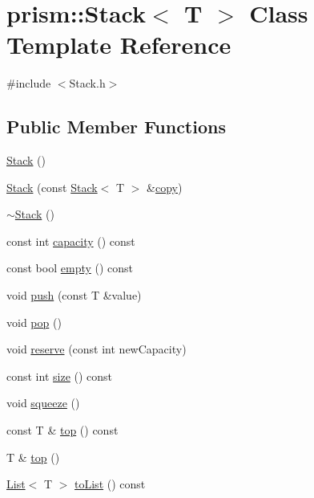 \hypertarget{classprism_1_1_stack}{}\section{prism\+:\+:Stack$<$ T $>$ Class Template Reference}
\label{classprism_1_1_stack}


{\ttfamily \#include $<$Stack.\+h$>$}

\subsection*{Public Member Functions}
\begin{DoxyCompactItemize}
\item 
\hyperlink{classprism_1_1_stack_aa28cd4f7d2c39d7f3828460d662c3725}{Stack} ()
\item 
\hyperlink{classprism_1_1_stack_ae2de2835a81ce5f19d6463bb7641c44f}{Stack} (const \hyperlink{classprism_1_1_stack}{Stack}$<$ T $>$ \&\hyperlink{namespaceprism_ae776f4cd825f79e7af1cf6ee1d90a209}{copy})
\item 
\hyperlink{classprism_1_1_stack_afd4f167bfe42d9b432d3d107a4fc1657}{$\sim$\+Stack} ()
\item 
const int \hyperlink{classprism_1_1_stack_a0933dadf5810c98d2e7c0c6ea1b65a56}{capacity} () const 
\item 
const bool \hyperlink{classprism_1_1_stack_a5e7e52656e03bdea14680f59f61219f9}{empty} () const 
\item 
void \hyperlink{classprism_1_1_stack_a7fb1e3478da9ff6782e99142621f21f2}{push} (const T \&value)
\item 
void \hyperlink{classprism_1_1_stack_a9c5679c5b671e0fc79d00c53462686a4}{pop} ()
\item 
void \hyperlink{classprism_1_1_stack_ae4e7c5bfe1435e87b4d2b4bac5ff749b}{reserve} (const int new\+Capacity)
\item 
const int \hyperlink{classprism_1_1_stack_ae51ff6d366bbaca46e60e3445e74b52b}{size} () const 
\item 
void \hyperlink{classprism_1_1_stack_ac80cada72fa44835425cd86f530cd64b}{squeeze} ()
\item 
const T \& \hyperlink{classprism_1_1_stack_a5af5f0fa0b2011871f144014ecb9b706}{top} () const 
\item 
T \& \hyperlink{classprism_1_1_stack_ae31d2e2ea1b8c80b7c48b5d88e0465d0}{top} ()
\item 
\hyperlink{classprism_1_1_list}{List}$<$ T $>$ \hyperlink{classprism_1_1_stack_a3df4ac477d015a536aceaeed8a94de69}{to\+List} () const 

\end{DoxyCompactItemize}
